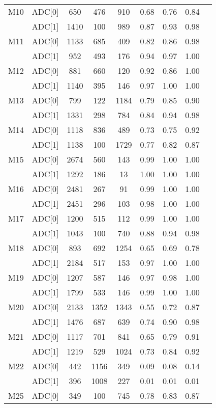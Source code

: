 \begin{longtable}{c c c c c c c c c}
  M10 & ADC[0] & 650 & 476 & 910 & 0.68 & 0.76 & 0.84\\
     & ADC[1] & 1410 & 100 & 989 & 0.87 & 0.93 & 0.98\\
  \midrule
  M11 & ADC[0] & 1133 & 685 & 409 & 0.82 & 0.86 & 0.98\\
     & ADC[1] & 952 & 493 & 176 & 0.94 & 0.97 & 1.00\\
  M12 & ADC[0] & 881 & 660 & 120 & 0.92 & 0.86 & 1.00\\
     & ADC[1] & 1140 & 395 & 146 & 0.97 & 1.00 & 1.00\\
  M13 & ADC[0] & 799 & 122 & 1184 & 0.79 & 0.85 & 0.90\\
     & ADC[1] & 1331 & 298 & 784 & 0.84 & 0.94 & 0.98\\
  M14 & ADC[0] & 1118 & 836 & 489 & 0.73 & 0.75 & 0.92\\
     & ADC[1] & 1138 & 100 & 1729 & 0.77 & 0.82 & 0.87\\
  M15 & ADC[0] & 2674 & 560 & 143 & 0.99 & 1.00 & 1.00\\
     & ADC[1] & 1292 & 186 & 13 & 1.00 & 1.00 & 1.00\\
  \midrule
  M16 & ADC[0] & 2481 & 267 & 91 & 0.99 & 1.00 & 1.00\\
     & ADC[1] & 2451 & 296 & 103 & 0.98 & 1.00 & 1.00\\
  M17 & ADC[0] & 1200 & 515 & 112 & 0.99 & 1.00 & 1.00\\
     & ADC[1] & 1043 & 100 & 740 & 0.88 & 0.94 & 0.98\\
  M18 & ADC[0] & 893 & 692 & 1254 & 0.65 & 0.69 & 0.78\\
     & ADC[1] & 2184 & 517 & 153 & 0.97 & 1.00 & 1.00\\
  M19 & ADC[0] & 1207 & 587 & 146 & 0.97 & 0.98 & 1.00\\
     & ADC[1] & 1799 & 533 & 146 & 0.99 & 1.00 & 1.00\\
  M20 & ADC[0] & 2133 & 1352 & 1343 & 0.55 & 0.72 & 0.87\\
     & ADC[1] & 1476 & 687 & 639 & 0.74 & 0.90 & 0.98\\
  M21 & ADC[0] & 1117 & 701 & 841 & 0.65 & 0.79 & 0.91\\
     & ADC[1] & 1219 & 529 & 1024 & 0.73 & 0.84 & 0.92\\
  M22 & ADC[0] & 442 & 1156 & 349 & 0.09 & 0.08 & 0.14\\
     & ADC[1] & 396 & 1008 & 227 & 0.01 & 0.01 & 0.01\\
  M25 & ADC[0] & 349 & 100 & 745 & 0.78 & 0.83 & 0.87\\

\end{longtable}
